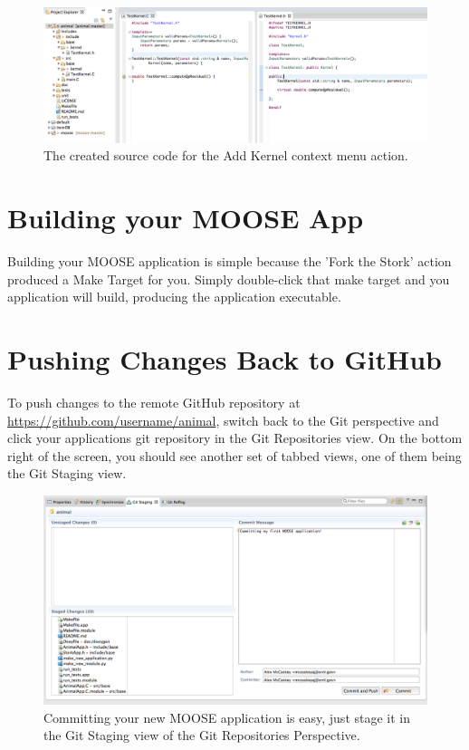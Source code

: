 \begin{figure}[htbp]
\centering
\includegraphics[width=\textwidth]{figures/Kernel_source.png}
\caption{The created source code for the Add Kernel context menu action. }
\end{figure}

\section{Building your MOOSE App}\label{building-your-moose-app}

Building your MOOSE application is simple because the 'Fork the Stork'
action produced a Make Target for you. Simply double-click that make
target and you application will build, producing the application
executable.

\section{Pushing Changes Back to
GitHub}\label{pushing-changes-back-to-github}

To push changes to the remote GitHub repository at
\url{https://github.com/username/animal}, switch back to the Git
perspective and click your applications git repository in the Git
Repositories view. On the bottom right of the screen, you should see
another set of tabbed views, one of them being the Git Staging view.

\begin{figure}[htbp]
\centering
\includegraphics[width=\textwidth]{figures/Git_commit.png}
\caption{Committing your new MOOSE application is easy, just stage it in the Git Staging view of the Git Repositories Perspective.}
\end{figure}

